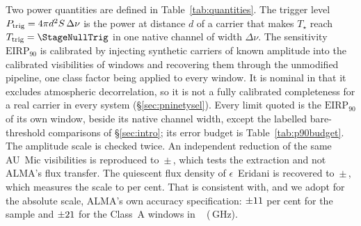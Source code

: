Two power quantities are defined in Table~\ref{tab:quantities}. The trigger
level $P_{\rm trig} = 4\pi d^{2}S\,\Delta\nu$ is the power at distance $d$ of a
carrier that makes $T_\star$ reach $T_{\rm trig}=\StageNullTrig$ in one native
channel of width $\Delta\nu$. The sensitivity $\mathrm{EIRP}_{90}$ is
calibrated by injecting synthetic carriers of known amplitude into the
calibrated visibilities of \SensNInj{} windows and recovering them through the
unmodified pipeline, one class factor being applied to every window. It is
nominal in that it excludes atmospheric decorrelation, so it is not a fully
calibrated completeness for a real carrier in every system
(\S\ref{sec:pninetysel}). Every limit quoted is the $\mathrm{EIRP}_{90}$ of its
own window, beside its native channel width, except the labelled
bare-threshold comparisons of \S\ref{sec:intro}; its error budget is
Table~\ref{tab:p90budget}. The amplitude scale is checked twice. An
independent reduction of the same AU~Mic visibilities is reproduced to
\PxJanRatio\,$\pm$\,\PxJanRatioErr, which tests the extraction and not ALMA's
flux transfer. The quiescent flux density of $\epsilon$~Eridani
\citep{Burton2022} is recovered to \PxEpsRatio\,$\pm$\,\PxEpsRatioErr, which
measures the scale to \SbEpsPct{} per cent. That is consistent with, and we
adopt for the absolute scale, ALMA's own accuracy specification: $\pm11$ per cent for the
sample and $\pm21$ for the \BudNHiWin{} Class~A windows in
\BudHiBandWord~\BudHiBands{} (\BudHiGHzList\,GHz).

